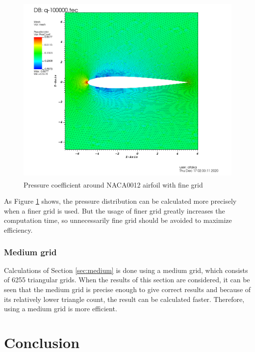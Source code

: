 \documentclass[letterpaper,12pt]{article}
\begin{document}
\vspace{1cm}

\begin{figure} [!h]
	\centering
	\includegraphics[height = 9.5cm]{graph/fine/fine_pressure0000.png}
	\caption{Pressure coefficient around NACA0012 airfoil with fine grid}
    \label{fig:airfoilfinepressure}
\end{figure}

\vspace{1cm}

As Figure \ref{fig:airfoilfinepressure} shows, the pressure distribution can be 
calculated more precisely when a finer grid is used. But the usage of finer grid
greatly increases the computation time, so unnecessarily fine grid should be avoided 
to maximize efficiency.

\subsubsection{Medium grid}

Calculations of Section \ref{sec:medium} is done using a medium grid, which consists of 
6255 triangular grids. When the results of this section are considered, it can be seen that
the medium grid is precise enough to give correct results and because of its relatively
lower triangle count, the result can be calculated faster. Therefore, using a medium grid
is more efficient.

\newpage

\section{Conclusion}
\end{document}
